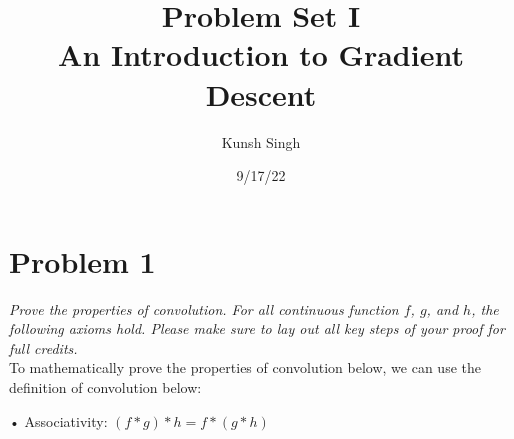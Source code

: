 \documentclass[12pt]{article}
\begin{document}
\thispagestyle{empty}

\title{Problem Set I\\[1ex]\large An Introduction to Gradient Descent}
\author{Kunsh Singh}
\date{9/17/22}
\maketitle
\pagebreak
\thispagestyle{fancy}
\;
\;
\noindent\section*{Problem 1}

\noindent \emph {Prove the properties of convolution. For all continuous function $f$, $g$, and $h$, the following axioms hold. {Please make sure to lay out all key steps of your proof for full credits.}} \\



\noindent To mathematically prove the properties of convolution below, we can use the definition of convolution below:  

\begin{center}
\end{center}

\;
\;
\;
\;
\;


• Associativity: $(f*g)*h = f*(g*h)$
\end{document}
